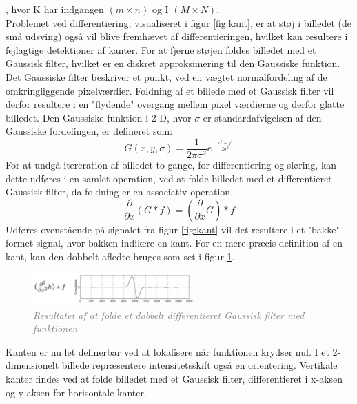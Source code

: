 , hvor K har indgangen $(m \times n)$ og I $(M \times N)$. \\
Problemet ved differentiering, visualiseret i figur \ref{fig:kant}, er at støj i billedet (de små udsving) også vil blive fremhævet af differentieringen, hvilket kan resultere i fejlagtige detektioner af kanter. For at fjerne støjen foldes billedet med et Gaussisk filter, hvilket er en diskret approksimering til den Gaussiske funktion. Det Gaussiske filter beskriver et punkt, ved en vægtet normalfordeling af de omkringliggende pixelværdier. Foldning af et billede med et Gaussisk filter vil derfor resultere i en "flydende" overgang mellem pixel værdierne og derfor glatte billedet.  Den Gaussiske funktion i 2-D, hvor $ \sigma $ er standardafvigelsen af den Gaussiske fordelingen, er defineret som:
\begin{equation}
G(x,y,\sigma) = \frac{1}{2 \pi \sigma ^{2}} e^{- \frac{x^{2} + y^{2}}{2 \sigma ^{2}}}
\label{2dgaussian}
\end{equation} 
For at undgå itereration af billedet to gange, for differentiering og sløring, kan dette udføres i en samlet operation, ved at folde billedet med et differentieret Gaussisk filter, da foldning er en associativ operation.
\begin{equation}
\dfrac{\partial}{\partial x}(G \ast f) = (\dfrac{\partial}{\partial x}G) \ast f
\end{equation}
Udføres ovenstående på signalet fra figur \ref{fig:kant} vil det resultere i et "bakke" formet signal, hvor bakken indikere en kant. For en mere præcis definition af en kant, kan den dobbelt afledte bruges som set i figur \ref{fig:deriv}.
\begin{figure}[H]
    \centering
    \includegraphics[width=0.55\textwidth]{fig/8.png}
    \vspace{-1em}   
    \begin{center}
    \caption{\textcolor{gray}{\footnotesize \textit{
     Resultatet af at folde et dobbelt differentieret Gaussisk filter med funktionen}}}
    \label{fig:deriv}
     \end{center}
    \vspace{-2.5em}  
  \end{figure}
\noindent
Kanten er nu let definerbar ved at lokalisere når funktionen krydser nul. I et 2-dimensionelt billede repræsentere intensitetsskift også en orientering. Vertikale kanter findes ved at folde billedet med et Gaussisk filter, differentieret i x-aksen og y-aksen for horisontale kanter.
